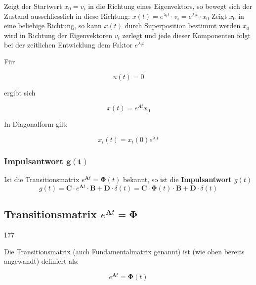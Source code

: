 \begin{outline}
    \1 Zeigt der Startwert $x_0 = v_i$ in die Richtung eines Eigenvektors, so bewegt sich der Zustand ausschliesslich in diese Richtung:
        $x(t) = e^{\lambda_i t} \cdot v_i = e^{\lambda_i t} \cdot x_0$
    \1 Zeigt $x_0$ in eine beliebige Richtung, so kann $x(t)$ durch Superposition bestimmt werden
        \2 $x_0$ wird in Richtung der Eigenvektoren $v_i$ zerlegt und jede dieser Komponenten folgt bei der zeitlichen Entwicklung dem Faktor $e^{\lambda_i t}$
\end{outline}


Für

\[
u(t)=0
\]

ergibt sich

\[
x(t)=e^{At}x_0
\]

In Diagonalform gilt:

\[
x_i(t)=x_i(0)e^{\lambda_i t}
\]

\subsubsection{Impulsantwort $\boldsymbol{g(t)}$}

Ist die Transitionsmatrix $e^{\bm{A} t} = \bm{\Phi}(t)$ bekannt, so ist die \textbf{Impulsantwort $g(t)$}
$$ \boxed{ g(t) = \bm{C} \cdot e^{\bm{A} t} \cdot \bm{B} + \bm{D} \cdot \delta(t) = \bm{C} \cdot \bm{\Phi}(t) \cdot \bm{B} + \bm{D} \cdot \delta(t) } $$


\subsection[Transitionsmatrix]{Transitionsmatrix $e^{\bm{A} t} = \bm{\Phi}$}{177}
\label{Transitionsmatrix}

\begin{minipage}[c]{0.7\columnwidth}
    \raggedright
    Die Transitionsmatrix (auch Fundamentalmatrix genannt) ist (wie oben bereits angewandt) definiert als:
\end{minipage}
\hfill
\begin{minipage}[c]{0.28\columnwidth}
    \raggedright
    $$ \boxed{ e^{\bm{A} t} = \bm{\Phi}(t) } $$
\end{minipage}

